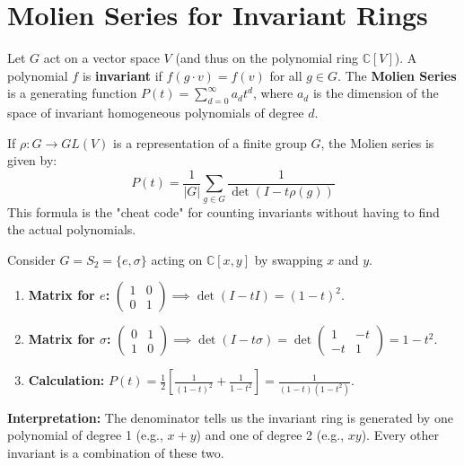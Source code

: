 \section{Molien Series for Invariant Rings}

\begin{definition}
Let $G$ act on a vector space $V$ (and thus on the polynomial ring $\mathbb{C}[V]$). A polynomial $f$ is \textbf{invariant} if $f(g \cdot v) = f(v)$ for all $g \in G$. The \textbf{Molien Series} is a generating function $P(t) = \sum_{d=0}^\infty a_d t^d$, where $a_d$ is the dimension of the space of invariant homogeneous polynomials of degree $d$.
\end{definition}

\begin{theorem}
If $\rho: G \to GL(V)$ is a representation of a finite group $G$, the Molien series is given by:
\[ P(t) = \frac{1}{|G|} \sum_{g \in G} \frac{1}{\det(I - t \rho(g))} \]
This formula is the "cheat code" for counting invariants without having to find the actual polynomials.
\end{theorem}

\begin{example}
Consider $G = S_2 = \{e, \sigma\}$ acting on $\mathbb{C}[x, y]$ by swapping $x$ and $y$. 
\begin{enumerate}
    \item \textbf{Matrix for $e$:} $\begin{pmatrix} 1 & 0 \\ 0 & 1 \end{pmatrix} \implies \det(I - tI) = (1-t)^2$.
    \item \textbf{Matrix for $\sigma$:} $\begin{pmatrix} 0 & 1 \\ 1 & 0 \end{pmatrix} \implies \det(I - t\sigma) = \det \begin{pmatrix} 1 & -t \\ -t & 1 \end{pmatrix} = 1 - t^2$.
    \item \textbf{Calculation:} $P(t) = \frac{1}{2} \left[ \frac{1}{(1-t)^2} + \frac{1}{1-t^2} \right] = \frac{1}{(1-t)(1-t^2)}$.
\end{enumerate}
\textbf{Interpretation:} The denominator tells us the invariant ring is generated by one polynomial of degree 1 (e.g., $x+y$) and one of degree 2 (e.g., $xy$). Every other invariant is a combination of these two.
\end{example}

